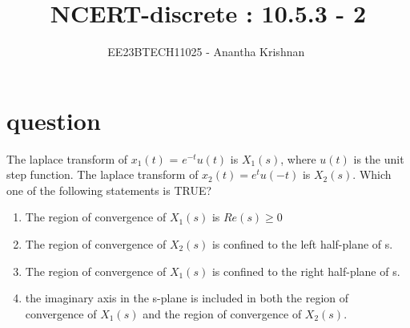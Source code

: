 \documentclass[journal,12pt,onecolumn]{IEEEtran}
\theoremstyle{remark}
\begin{document}

\vspace{3cm}

\title{NCERT-discrete : 10.5.3 - 2}
\author{EE23BTECH11025 - Anantha Krishnan $^{}$%
}
\maketitle
\bigskip



\section{question}

The laplace transform of $x_1(t)$ = $e^{-t}u(t)$ is $X_1(s)$, where $u(t)$ is the unit step function. The laplace transform of $x_2(t) = e^tu(-t)$ is $X_2(s)$. Which one of the following statements is TRUE?
\begin{enumerate}
    \item The region of convergence of $X_1(s)$ is $Re(s) \geq 0$
    \item The region of convergence of $X_2(s)$ is confined to the left half-plane of s.
    \item The region of convergence of $X_1(s)$ is confined to the right half-plane of s.
    \item the imaginary axis in the s-plane is included in both the region of convergence of $X_1(s)$ and the region of convergence of $X_2(s)$.
\end{enumerate}
 
\end{document}
